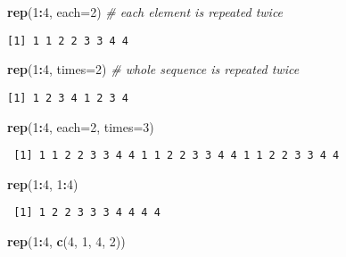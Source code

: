 \documentclass[
]{book}
\newenvironment{Shaded}{\begin{snugshade}}{\end{snugshade}}
\newcommand{\CommentTok}[1]{\textcolor[rgb]{0.56,0.35,0.01}{\textit{#1}}}
\newcommand{\DataTypeTok}[1]{\textcolor[rgb]{0.13,0.29,0.53}{#1}}
\newcommand{\DecValTok}[1]{\textcolor[rgb]{0.00,0.00,0.81}{#1}}
\newcommand{\KeywordTok}[1]{\textcolor[rgb]{0.13,0.29,0.53}{\textbf{#1}}}
\newcommand{\NormalTok}[1]{#1}
\newcommand{\OperatorTok}[1]{\textcolor[rgb]{0.81,0.36,0.00}{\textbf{#1}}}
\begin{document}
\begin{Shaded}
\begin{Highlighting}[]
\KeywordTok{rep}\NormalTok{(}\DecValTok{1}\OperatorTok{:}\DecValTok{4}\NormalTok{, }\DataTypeTok{each=}\DecValTok{2}\NormalTok{) }\CommentTok{# each element is repeated twice}
\end{Highlighting}
\end{Shaded}

\begin{verbatim}
[1] 1 1 2 2 3 3 4 4
\end{verbatim}

\begin{Shaded}
\begin{Highlighting}[]
\KeywordTok{rep}\NormalTok{(}\DecValTok{1}\OperatorTok{:}\DecValTok{4}\NormalTok{, }\DataTypeTok{times=}\DecValTok{2}\NormalTok{) }\CommentTok{# whole sequence is repeated twice}
\end{Highlighting}
\end{Shaded}

\begin{verbatim}
[1] 1 2 3 4 1 2 3 4
\end{verbatim}

\begin{Shaded}
\begin{Highlighting}[]
\KeywordTok{rep}\NormalTok{(}\DecValTok{1}\OperatorTok{:}\DecValTok{4}\NormalTok{, }\DataTypeTok{each=}\DecValTok{2}\NormalTok{, }\DataTypeTok{times=}\DecValTok{3}\NormalTok{)}
\end{Highlighting}
\end{Shaded}

\begin{verbatim}
 [1] 1 1 2 2 3 3 4 4 1 1 2 2 3 3 4 4 1 1 2 2 3 3 4 4
\end{verbatim}

\begin{Shaded}
\begin{Highlighting}[]
\KeywordTok{rep}\NormalTok{(}\DecValTok{1}\OperatorTok{:}\DecValTok{4}\NormalTok{, }\DecValTok{1}\OperatorTok{:}\DecValTok{4}\NormalTok{)}
\end{Highlighting}
\end{Shaded}

\begin{verbatim}
 [1] 1 2 2 3 3 3 4 4 4 4
\end{verbatim}

\begin{Shaded}
\begin{Highlighting}[]
\KeywordTok{rep}\NormalTok{(}\DecValTok{1}\OperatorTok{:}\DecValTok{4}\NormalTok{, }\KeywordTok{c}\NormalTok{(}\DecValTok{4}\NormalTok{, }\DecValTok{1}\NormalTok{, }\DecValTok{4}\NormalTok{, }\DecValTok{2}\NormalTok{))}
\end{Highlighting}
\end{Shaded}
\end{document}
